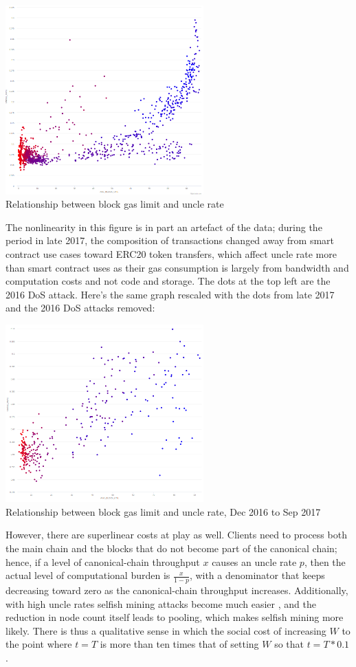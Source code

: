 \documentclass[12pt, final]{article}
\begin{document}
\begin{center}
\includegraphics[width=3in]{etherchain_correlation.png} \\
\footnotesize{Relationship between block gas limit and uncle rate}
\label{fig:three}
\end{center}

The nonlinearity in this figure is in part an artefact of the data; during the period in late 2017, the composition of transactions changed away from smart contract use cases toward ERC20 token transfers, which affect uncle rate more than smart contract uses as their gas consumption is largely from bandwidth and computation costs and not code and storage. The dots at the top left are the 2016 DoS attack. Here's the same graph rescaled with the dots from late 2017 and the 2016 DoS attacks removed:

\begin{center}
\includegraphics[width=3in]{etherchain_correlation_2.png} \\
\footnotesize{Relationship between block gas limit and uncle rate, Dec 2016 to Sep 2017}
\label{fig:three}
\end{center}

However, there are superlinear costs at play as well. Clients need to process both the main chain and the blocks that do not become part of the canonical chain; hence, if a level of canonical-chain throughput $x$ causes an uncle rate $p$, then the actual level of computational burden is $\frac{x}{1-p}$, with a denominator that keeps decreasing toward zero as the canonical-chain throughput increases. Additionally, with high uncle rates selfish mining attacks become much easier \cite{optimalsm}, and the reduction in node count itself leads to pooling, which makes selfish mining more likely. There is thus a qualitative sense in which the social cost of increasing $W$ to the point where $t = T$ is more than ten times that of setting $W$ so that $t = T * 0.1$.
\end{document}

